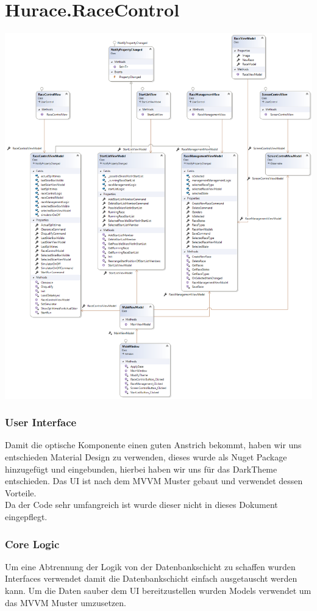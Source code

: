 \documentclass[a4paper, 12pt]{article}
\begin{document}
	\section{Hurace.RaceControl}
	\includegraphics[width=.9\textwidth]{img/RaceControl.png}
	\subsubsection{User Interface}
	
	Damit die optische Komponente einen guten Anstrich bekommt, haben wir uns entschieden Material Design zu verwenden, dieses wurde als Nuget Package hinzugefügt und eingebunden, hierbei haben wir uns für das DarkTheme entschieden. Das UI ist nach dem MVVM Muster gebaut und verwendet dessen Vorteile.\\
	Da der Code sehr umfangreich ist wurde dieser nicht in dieses Dokument eingepflegt.
	
	\newpage
	\subsubsection{Core Logic}
	Um eine Abtrennung der Logik von der Datenbankschicht zu schaffen wurden Interfaces verwendet damit die Datenbankschicht einfach ausgetauscht werden kann. Um die Daten sauber dem UI bereitzustellen wurden Models verwendet um das MVVM Muster umzusetzen.
	\newline
	
\end{document}
